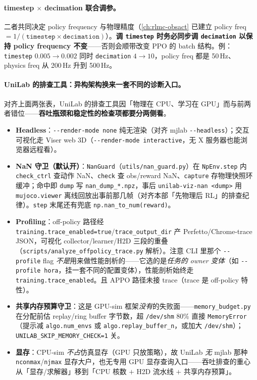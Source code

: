 \paragraph{timestep $\times$ decimation 联合调参。}二者共同决定 policy frequency 与物理精度（\cref{ch:rlmc-obsact} 已建立 policy freq $=1/(\texttt{timestep}\times\texttt{decimation})$）。\textbf{调 \texttt{timestep} 时务必同步调 \texttt{decimation} 以保持 policy frequency 不变}——否则会顺带改变 PPO 的 batch 结构。例：\verb|timestep| $0.005\to0.002$ 同时 \verb|decimation| $4\to10$，policy freq 都是 50\,Hz、physics freq 从 200\,Hz 升到 500\,Hz。

\paragraph{UniLab 的排查工具：异构架构换来一套不同的诊断入口。}对齐上面两张表，UniLab 的排查工具因「物理在 CPU、学习在 GPU」而与前两者错位——\textbf{吞吐瓶颈和稳定性的检查项都要分两侧看}。

\begin{itemize}
  \item \textbf{Headless}：\verb|--render-mode none| 纯无渲染（对齐 mjlab \verb|--headless|）；交互可视化走 Viser web 3D（\verb|--render-mode interactive|，无 X 服务器也能浏览器远程看）。
  \item \textbf{NaN 守卫（默认开）}：\verb|NanGuard|（\verb|utils/nan_guard.py|）在 \verb|NpEnv.step| 内 \verb|check_ctrl| 查动作 NaN、\verb|check| 查 obs/reward NaN、\verb|capture| 存物理快照环缓冲；命中即 \verb|dump| 写 \verb|nan_dump_*.npz|，事后 \verb|unilab-viz-nan <dump>| 用 \verb|mujoco.viewer| 离线回放出事前那几帧（对齐本部「先物理后 RL」的排查纪律）。\verb|step| 末尾还有兜底 \verb|np.nan_to_num(reward)|。
  \item \textbf{Profiling}：off-policy 路径经 \verb|training.trace_enabled=true|/\verb|trace_output_dir| 产 Perfetto/Chrome-trace JSON，可视化 collector/learner/H2D 三段的重叠（\verb|scripts/analyze_offpolicy_trace.py| 解析）。注意 CLI 里那个 \verb|--profile| flag \emph{不是}用来做性能剖析的——它选的是\emph{任务的 owner 变体}（如 \verb|--profile hora|，挂一套不同的配置变体），性能剖析始终走 \verb|training.trace_enabled|。且 APPO 路径未接 trace（trace 是 off-policy 特性）。
  \item \textbf{共享内存预算守卫}：这是 GPU-sim 框架\emph{没有}的失败面——\verb|memory_budget.py| 在分配前估 replay/ring buffer 字节数，超 \verb|/dev/shm| 80\% 直接 \verb|MemoryError|（提示减 \verb|algo.num_envs| 或 \verb|algo.replay_buffer_n|，或加大 \verb|/dev/shm|）；\verb|UNILAB_SKIP_MEMORY_CHECK=1| 关。
  \item \textbf{显存}：CPU-sim \emph{不占}仿真显存（GPU 只放策略），故 UniLab \emph{无} mjlab 那种 \verb|nconmax|/\verb|njmax| 显存大户，也无专用 GPU 显存查询入口——吞吐排查的重心从「显存/求解器」移到「CPU 核数 $+$ H2D 流水线 $+$ 共享内存预算」。
\end{itemize}

